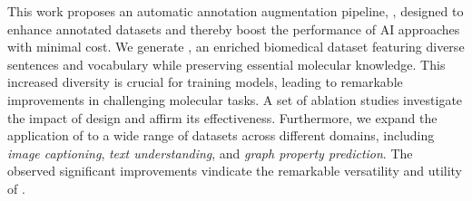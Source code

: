 This work proposes an automatic annotation augmentation pipeline, \pipeline, designed to enhance annotated datasets and thereby boost the performance of AI approaches with minimal cost. 
We generate \newdataset, an enriched biomedical dataset featuring diverse sentences and vocabulary while preserving essential molecular knowledge.
This increased diversity is crucial for training \newmodel models, leading to remarkable improvements in challenging molecular tasks. 
A set of ablation studies investigate the impact of \pipeline design and affirm its effectiveness. 
% 
Furthermore, we expand the application of \pipeline to a wide range of datasets across different domains, including \emph{image captioning}, \emph{text understanding}, and \emph{graph property prediction}.
The observed significant improvements vindicate the remarkable versatility and utility of \pipeline.
